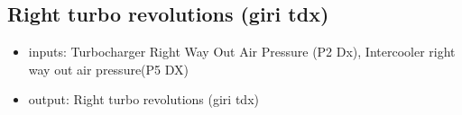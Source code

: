 %
%
%
%
%


\subsection{Right turbo revolutions (giri tdx)}
\begin{itemize}
	\item{inputs: Turbocharger Right Way Out Air Pressure (P2 Dx), Intercooler right way out air pressure(P5 DX)}
	\item{output: Right turbo revolutions (giri tdx)}
\end{itemize}	




%
%
%
%
%

